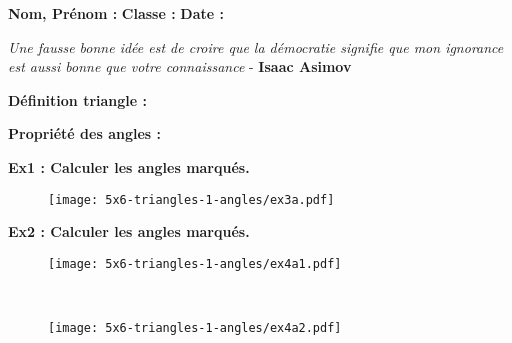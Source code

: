 



\textbf{Nom, Prénom :} \hspace{8cm} \textbf{Classe :} \hspace{3cm} \textbf{Date :}\\

\begin{center}
  \textit{Une fausse bonne idée est de croire que la démocratie signifie que mon ignorance est aussi bonne que votre connaissance}  - \textbf{Isaac Asimov}
\end{center}


\textbf{Définition triangle :} \\ \Pointilles[3]

\textbf{Propriété des angles :} \\ \Pointilles[3]

\textbf{Ex1 : Calculer les angles marqués.}

\begin{figure}[H]
  \centering
  \texttt{[image: 5x6-triangles-1-angles/ex3a.pdf]}
\end{figure}

\begin{multicols}{4}
\Pointilles[4] 
\columnbreak 

\Pointilles[4] 
\columnbreak 

\Pointilles[4] 
\columnbreak 

\Pointilles[4] 
\columnbreak 
\end{multicols}

\textbf{Ex2 : Calculer les angles marqués.}

\begin{minipage}[t]{0.4\textwidth}
  \begin{figure}[H]
    \centering
    \texttt{[image: 5x6-triangles-1-angles/ex4a1.pdf]}
  \end{figure}
\end{minipage}
\begin{minipage}[t]{0.6\textwidth}
  \Pointilles[11] \\
\end{minipage}

\begin{minipage}[t]{0.4\textwidth}
  \begin{figure}[H]
    \centering
    \texttt{[image: 5x6-triangles-1-angles/ex4a2.pdf]}
  \end{figure}
\end{minipage}
\begin{minipage}[t]{0.6\textwidth}
  \Pointilles[11] \\
\end{minipage}

